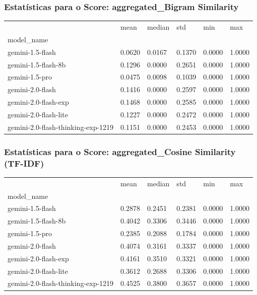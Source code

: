 \documentclass{article}%
\begin{document}
\subsubsection*{Estatísticas para o Score: aggregated\_Bigram Similarity}%
\begin{table}[H]%
\centering%
\begin{tabular}{llllll}
\toprule
 & mean & median & std & min & max \\
model_name &  &  &  &  &  \\
\midrule
gemini-1.5-flash & 0.0620 & 0.0167 & 0.1370 & 0.0000 & 1.0000 \\
gemini-1.5-flash-8b & 0.1296 & 0.0000 & 0.2651 & 0.0000 & 1.0000 \\
gemini-1.5-pro & 0.0475 & 0.0098 & 0.1039 & 0.0000 & 1.0000 \\
gemini-2.0-flash & 0.1416 & 0.0000 & 0.2597 & 0.0000 & 1.0000 \\
gemini-2.0-flash-exp & 0.1468 & 0.0000 & 0.2585 & 0.0000 & 1.0000 \\
gemini-2.0-flash-lite & 0.1227 & 0.0000 & 0.2472 & 0.0000 & 1.0000 \\
gemini-2.0-flash-thinking-exp-1219 & 0.1151 & 0.0000 & 0.2453 & 0.0000 & 1.0000 \\
\bottomrule
\end{tabular}
%
\end{table}%
\vspace{0.5cm}%
\subsubsection*{Estatísticas para o Score: aggregated\_Cosine Similarity (TF-IDF)}%
\begin{table}[H]%
\centering%
\begin{tabular}{llllll}
\toprule
 & mean & median & std & min & max \\
model_name &  &  &  &  &  \\
\midrule
gemini-1.5-flash & 0.2878 & 0.2451 & 0.2381 & 0.0000 & 1.0000 \\
gemini-1.5-flash-8b & 0.4042 & 0.3306 & 0.3446 & 0.0000 & 1.0000 \\
gemini-1.5-pro & 0.2385 & 0.2088 & 0.1784 & 0.0000 & 1.0000 \\
gemini-2.0-flash & 0.4074 & 0.3161 & 0.3337 & 0.0000 & 1.0000 \\
gemini-2.0-flash-exp & 0.4161 & 0.3510 & 0.3321 & 0.0000 & 1.0000 \\
gemini-2.0-flash-lite & 0.3612 & 0.2688 & 0.3306 & 0.0000 & 1.0000 \\
gemini-2.0-flash-thinking-exp-1219 & 0.4525 & 0.3800 & 0.3657 & 0.0000 & 1.0000 \\
\bottomrule
\end{tabular}
%
\end{table}%
\vspace{0.5cm}%
\end{document}
